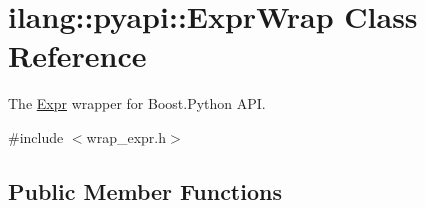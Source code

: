 \hypertarget{classilang_1_1pyapi_1_1_expr_wrap}{}\section{ilang\+:\+:pyapi\+:\+:Expr\+Wrap Class Reference}
\label{classilang_1_1pyapi_1_1_expr_wrap}


The \mbox{\hyperlink{classilang_1_1_expr}{Expr}} wrapper for Boost.\+Python A\+PI.  




{\ttfamily \#include $<$wrap\+\_\+expr.\+h$>$}

\subsection*{Public Member Functions}
